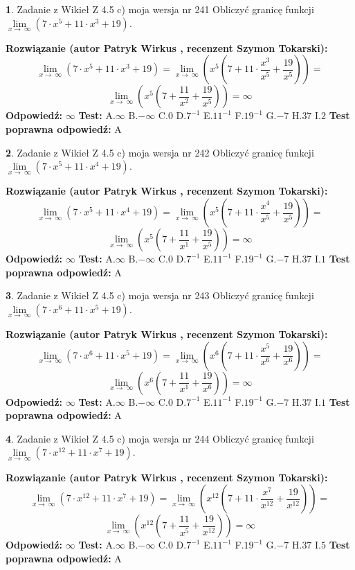\documentclass[12pt, a4paper]{article}
\theoremstyle{definition} %
\newtheorem{zad}{}
\newcommand{\zadStart}[1]{\begin{zad}#1\newline}
\newcommand{\zadStop}{\end{zad}}
\newcommand{\rozwStart}[2]{\noindent \textbf{Rozwiązanie (autor #1 , recenzent #2): }\newline}
\newcommand{\rozwStop}{\newline}
\newcommand{\odpStart}{\noindent \textbf{Odpowiedź:}\newline}
\newcommand{\odpStop}{\newline}
\newcommand{\testStart}{\noindent \textbf{Test:}\newline}
\newcommand{\testStop}{\newline}
\newcommand{\kluczStart}{\noindent \textbf{Test poprawna odpowiedź:}\newline}
\newcommand{\kluczStop}{\newline}
\begin{document}
\zadStart{Zadanie z Wikieł Z 4.5 c) moja wersja nr 241}
Obliczyć granicę funkcji  $\lim\limits_{x\to\ \infty}(7 \cdot x^{5}+11 \cdot x^{3}+19)$.
\zadStop
\rozwStart{Patryk Wirkus}{Szymon Tokarski}
$$\lim\limits_{x\to\ \infty}(7 \cdot x^{5}+11 \cdot x^{3}+19) = \lim\limits_{x\to\ \infty}(x^{5}(7 +11 \cdot \frac{x^{3}}{x^{5}}+\frac{19}{x^{5}})) =$$ $$\lim\limits_{x\to\ \infty}(x^{5}(7 +\frac{11}{x^{2}}+\frac{19}{x^{5}})) =\infty$$
\rozwStop
\odpStart
$\infty$
\odpStop
\testStart
A.$\infty$ B.$-\infty$ C.$0$ D.$7^{-1}$ E.$11^{-1}$
F.$19^{-1}$ G.$-7$
H.$37$
I.$2$
\testStop
\kluczStart
A
\kluczStop



\zadStart{Zadanie z Wikieł Z 4.5 c) moja wersja nr 242}
Obliczyć granicę funkcji  $\lim\limits_{x\to\ \infty}(7 \cdot x^{5}+11 \cdot x^{4}+19)$.
\zadStop
\rozwStart{Patryk Wirkus}{Szymon Tokarski}
$$\lim\limits_{x\to\ \infty}(7 \cdot x^{5}+11 \cdot x^{4}+19) = \lim\limits_{x\to\ \infty}(x^{5}(7 +11 \cdot \frac{x^{4}}{x^{5}}+\frac{19}{x^{5}})) =$$ $$\lim\limits_{x\to\ \infty}(x^{5}(7 +\frac{11}{x^{1}}+\frac{19}{x^{5}})) =\infty$$
\rozwStop
\odpStart
$\infty$
\odpStop
\testStart
A.$\infty$ B.$-\infty$ C.$0$ D.$7^{-1}$ E.$11^{-1}$
F.$19^{-1}$ G.$-7$
H.$37$
I.$1$
\testStop
\kluczStart
A
\kluczStop



\zadStart{Zadanie z Wikieł Z 4.5 c) moja wersja nr 243}
Obliczyć granicę funkcji  $\lim\limits_{x\to\ \infty}(7 \cdot x^{6}+11 \cdot x^{5}+19)$.
\zadStop
\rozwStart{Patryk Wirkus}{Szymon Tokarski}
$$\lim\limits_{x\to\ \infty}(7 \cdot x^{6}+11 \cdot x^{5}+19) = \lim\limits_{x\to\ \infty}(x^{6}(7 +11 \cdot \frac{x^{5}}{x^{6}}+\frac{19}{x^{6}})) =$$ $$\lim\limits_{x\to\ \infty}(x^{6}(7 +\frac{11}{x^{1}}+\frac{19}{x^{6}})) =\infty$$
\rozwStop
\odpStart
$\infty$
\odpStop
\testStart
A.$\infty$ B.$-\infty$ C.$0$ D.$7^{-1}$ E.$11^{-1}$
F.$19^{-1}$ G.$-7$
H.$37$
I.$1$
\testStop
\kluczStart
A
\kluczStop



\zadStart{Zadanie z Wikieł Z 4.5 c) moja wersja nr 244}
Obliczyć granicę funkcji  $\lim\limits_{x\to\ \infty}(7 \cdot x^{12}+11 \cdot x^{7}+19)$.
\zadStop
\rozwStart{Patryk Wirkus}{Szymon Tokarski}
$$\lim\limits_{x\to\ \infty}(7 \cdot x^{12}+11 \cdot x^{7}+19) = \lim\limits_{x\to\ \infty}(x^{12}(7 +11 \cdot \frac{x^{7}}{x^{12}}+\frac{19}{x^{12}})) =$$ $$\lim\limits_{x\to\ \infty}(x^{12}(7 +\frac{11}{x^{5}}+\frac{19}{x^{12}})) =\infty$$
\rozwStop
\odpStart
$\infty$
\odpStop
\testStart
A.$\infty$ B.$-\infty$ C.$0$ D.$7^{-1}$ E.$11^{-1}$
F.$19^{-1}$ G.$-7$
H.$37$
I.$5$
\testStop
\kluczStart
A
\kluczStop
\end{document}
